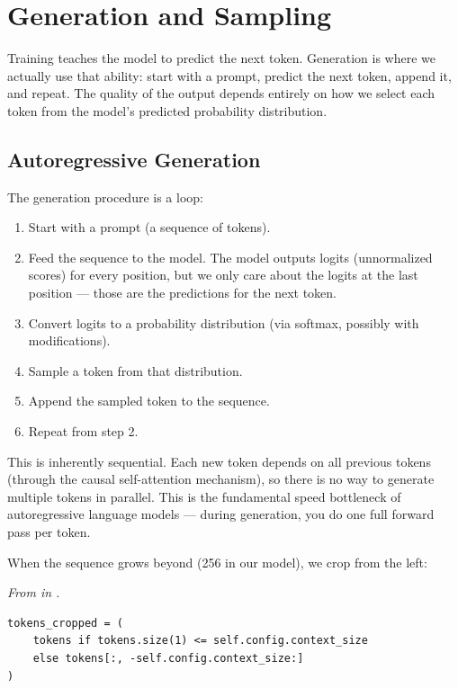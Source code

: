 \chapter{Generation and Sampling}

Training teaches the model to predict the next token. Generation is where we actually use that ability: start with a prompt, predict the next token, append it, and repeat. The quality of the output depends entirely on how we select each token from the model's predicted probability distribution.

\section{Autoregressive Generation}

The generation procedure is a loop:

\begin{enumerate}
  \item Start with a prompt (a sequence of tokens).
  \item Feed the sequence to the model. The model outputs logits (unnormalized scores) for every position, but we only care about the logits at the last position --- those are the predictions for the next token.
  \item Convert logits to a probability distribution (via softmax, possibly with modifications).
  \item Sample a token from that distribution.
  \item Append the sampled token to the sequence.
  \item Repeat from step 2.
\end{enumerate}

This is inherently sequential. Each new token depends on all previous tokens (through the causal self-attention mechanism), so there is no way to generate multiple tokens in parallel. This is the fundamental speed bottleneck of autoregressive language models --- during generation, you do one full forward pass per token.

When the sequence grows beyond  (256 in our model), we crop from the left:

\concepttag
{\small\itshape From  in .}
\begin{lstlisting}
tokens_cropped = (
    tokens if tokens.size(1) <= self.config.context_size
    else tokens[:, -self.config.context_size:]
)
\end{lstlisting}

